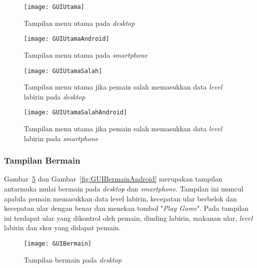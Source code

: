 \begin{figure}[H]
	\centering  
	\texttt{[image: GUIUtama]}  
	\caption[Tampilan menu utama pada \textit{desktop}]{Tampilan menu utama pada \textit{desktop}}
	\label{fig:GUIUtama} 
\end{figure}

\begin{figure}[H]
	\centering  
	\texttt{[image: GUIUtamaAndroid]}  
	\caption[Tampilan menu utama pada \textit{smartphone}]{Tampilan menu utama pada \textit{smartphone}}
	\label{fig:GUIUtamaAndroid} 
\end{figure}

\begin{figure}[H]
	\centering  
	\texttt{[image: GUIUtamaSalah]}  
	\caption[Tampilan menu utama jika pemain salah memasukkan data \textit{level} labirin pada \textit{desktop}]{Tampilan menu utama jika pemain salah memasukkan data \textit{level} labirin pada \textit{desktop}}
	\label{fig:GUIUtamaSalah} 
\end{figure}

\begin{figure}[H]
	\centering  
	\texttt{[image: GUIUtamaSalahAndroid]}  
	\caption[Tampilan menu utama jika pemain salah memasukkan data \textit{level} labirin pada \textit{smartphone}]{Tampilan menu utama jika pemain salah memasukkan data \textit{level} labirin pada \textit{smartphone}}
	\label{fig:GUIUtamaSalahAndroid} 
\end{figure}

\subsubsection{Tampilan Bermain}
Gambar~\ref{fig:GUIBermain} dan Gambar~\ref{fig:GUIBermainAndroid} merupakan tampilan antarmuka mulai bermain pada \textit{desktop} dan \textit{smartphone}. Tampilan ini muncul apabila pemain memasukkan data level labirin, kecepatan ular berbelok dan kecepatan ular dengan benar dan menekan tombol "\textit{Play Game}". Pada tampilan ini terdapat ular yang dikontrol oleh pemain, dinding labirin, makanan ular, \textit{level} labirin dan skor yang didapat pemain.

\begin{figure}[H]
	\centering  
	\texttt{[image: GUIBermain]}  
	\caption[Tampilan bermain pada \textit{desktop}]{Tampilan bermain pada \textit{desktop}}
	\label{fig:GUIBermain} 
\end{figure}

